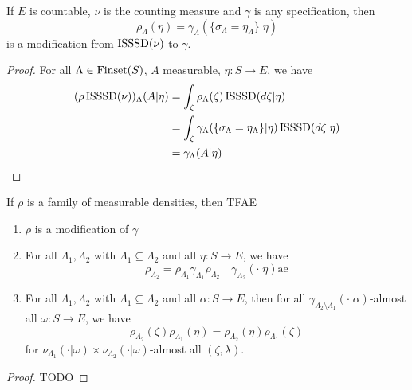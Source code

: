 


\begin{lemma}
    \label{lem:exists-modification-countable}

    If $E$ is countable, $\nu$ is the counting measure and $\gamma$ is any specification, then
    $$\rho_\Lambda(\eta) = \gamma_\Lambda(\{\sigma_\Lambda = \eta_\Lambda\} | \eta)$$
    is a modification from $\operatorname{ISSSD}(\nu)$ to $\gamma$.
\end{lemma}
\begin{proof}

    For all $\Lambda \in \operatorname{Finset}(S)$, $A$ measurable, $\eta : S \to E$, we have
    \begin{align}
        (\rho\operatorname{ISSSD}(\nu))_\Lambda(A|\eta)
        & = \int_\zeta \rho_\Lambda(\zeta) \operatorname{ISSSD}(d\zeta|\eta) \\
        & = \int_\zeta \gamma_\Lambda(\{\sigma_\Lambda = \eta_\Lambda\} | \eta) \operatorname{ISSSD}(d\zeta|\eta) \\
        & = \gamma_\Lambda(A|\eta)
    \end{align}
\end{proof}

\begin{proposition}
    \label{prop:modification-tfae}

    If $\rho$ is a family of measurable densities, then TFAE
    \begin{enumerate}
        \item $\rho$ is a modification of $\gamma$
        \item For all $\Lambda_1, \Lambda_2$ with $\Lambda_1 \subseteq \Lambda_2$ and all $\eta : S \to E$, we have
        $$\rho_{\Lambda_2} = \rho_{\Lambda_1} \gamma_{\Lambda_1} \rho_{\Lambda_2} \quad \gamma_{\Lambda_2}(\cdot|\eta)\text{ae}$$
        \item For all $\Lambda_1, \Lambda_2$ with $\Lambda_1 \subseteq \Lambda_2$ and all $\alpha : S \to E$, then for all $\gamma_{\Lambda_2 \setminus \Lambda_1}(\cdot|\alpha)$-almost all $\omega : S \to E$, we have
        $$\rho_{\Lambda_2}(\zeta)\rho_{\Lambda_1}(\eta) = \rho_{\Lambda_2}(\eta) \rho_{\Lambda_1}(\zeta)$$
        for $\nu_{\Lambda_1}(\cdot|\omega) \times \nu_{\Lambda_2}(\cdot|\omega)$-almost all $(\zeta, \lambda)$.
    \end{enumerate}
\end{proposition}
\begin{proof}

    TODO
\end{proof}

